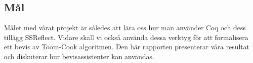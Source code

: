 \subsection{Mål}
Målet med vårat projekt är således att lära oss hur man använder Coq och dess
tillägg SSReflect. Vidare skall vi också använda dessa verktyg för att
formalisera ett bevis av Toom-Cook algoritmen. Den här rapporten presenterar
våra resultat och diskuterar hur bevisassistenter kan användas.
